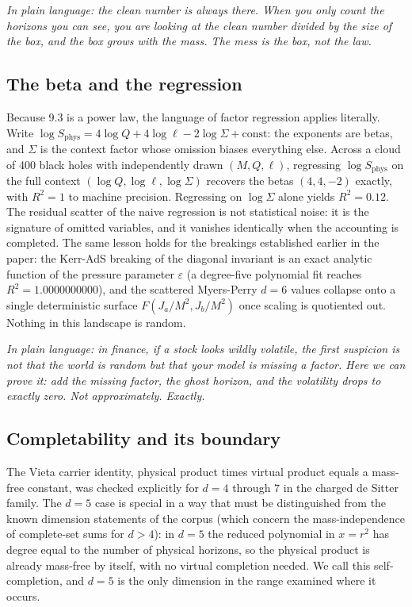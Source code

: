 \documentclass[11pt]{article}
\begin{document}
\emph{In plain language: the clean number is always there. When you only count the horizons you can see, you are looking at the clean number divided by the size of the box, and the box grows with the mass. The mess is the box, not the law.}

\subsection{The beta and the regression}

Because 9.3 is a power law, the language of factor regression applies literally. Write $\log S_{\text{phys}} = 4\log Q + 4\log\ell - 2\log\Sigma + \text{const}$: the exponents are betas, and $\Sigma$ is the context factor whose omission biases everything else. Across a cloud of 400 black holes with independently drawn $(M, Q, \ell)$, regressing $\log S_{\text{phys}}$ on the full context $(\log Q, \log\ell, \log\Sigma)$ recovers the betas $(4, 4, -2)$ exactly, with $R^2 = 1$ to machine precision. Regressing on $\log\Sigma$ alone yields $R^2 = 0.12$. The residual scatter of the naive regression is not statistical noise: it is the signature of omitted variables, and it vanishes identically when the accounting is completed. The same lesson holds for the breakings established earlier in the paper: the Kerr-AdS breaking of the diagonal invariant is an exact analytic function of the pressure parameter $\varepsilon$ (a degree-five polynomial fit reaches $R^2 = 1.0000000000$), and the scattered Myers-Perry $d = 6$ values collapse onto a single deterministic surface $F(J_a/M^2, J_b/M^2)$ once scaling is quotiented out. Nothing in this landscape is random.

\emph{In plain language: in finance, if a stock looks wildly volatile, the first suspicion is not that the world is random but that your model is missing a factor. Here we can prove it: add the missing factor, the ghost horizon, and the volatility drops to exactly zero. Not approximately. Exactly.}

\subsection{Completability and its boundary}

The Vieta carrier identity, physical product times virtual product equals a mass-free constant, was checked explicitly for $d = 4$ through $7$ in the charged de Sitter family. The $d = 5$ case is special in a way that must be distinguished from the known dimension statements of the corpus (which concern the mass-independence of complete-set sums for $d > 4$): in $d = 5$ the reduced polynomial in $x = r^2$ has degree equal to the number of physical horizons, so the physical product is already mass-free by itself, with no virtual completion needed. We call this self-completion, and $d = 5$ is the only dimension in the range examined where it occurs.
\end{document}
